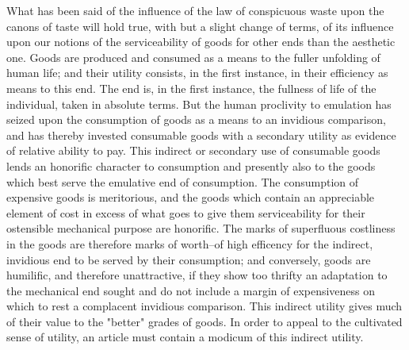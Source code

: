 \documentclass[12pt]{report}
\begin{document}
What has been said of the influence of the law of conspicuous waste upon
the canons of taste will hold true, with but a slight change of terms,
of its influence upon our notions of the serviceability of goods for
other ends than the aesthetic one. Goods are produced and consumed as a
means to the fuller unfolding of human life; and their utility consists,
in the first instance, in their efficiency as means to this end. The end
is, in the first instance, the fullness of life of the individual, taken
in absolute terms. But the human proclivity to emulation has seized upon
the consumption of goods as a means to an invidious comparison, and has
thereby invested consumable goods with a secondary utility as evidence
of relative ability to pay. This indirect or secondary use of consumable
goods lends an honorific character to consumption and presently also
to the goods which best serve the emulative end of consumption. The
consumption of expensive goods is meritorious, and the goods which
contain an appreciable element of cost in excess of what goes to
give them serviceability for their ostensible mechanical purpose
are honorific. The marks of superfluous costliness in the goods are
therefore marks of worth--of high efficency for the indirect, invidious
end to be served by their consumption; and conversely, goods are
humilific, and therefore unattractive, if they show too thrifty an
adaptation to the mechanical end sought and do not include a margin of
expensiveness on which to rest a complacent invidious comparison. This
indirect utility gives much of their value to the "better" grades of
goods. In order to appeal to the cultivated sense of utility, an article
must contain a modicum of this indirect utility.
\end{document}

